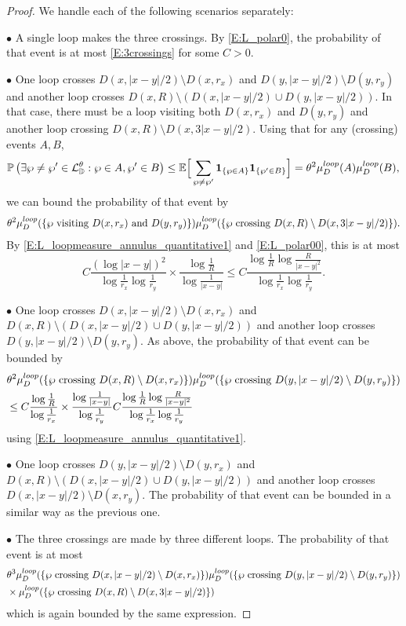 \documentclass[11pt]{article}
\theoremstyle{remark}
\newcommand{\D}{\mathbb{D}}
\newcommand{\Lc}{\mathcal{L}}
\newcommand{\Prob}[1]{\mathbb{P} \left( #1 \right) }
\newcommand{\E}{\mathbb{E}}
\newcommand{\indic}[1]{ \mathbf{1}_{ \left\{ #1 \right\} } }
\def \loopmeasure{\mu^{\rm loop}}
\numberwithin{equation}{section}
\begin{document}
\begin{proof}
We handle each of the following scenarios separately:

$\bullet$ A single loop makes the three crossings.
By \eqref{E:L_polar0}, the probability of that event is at most \eqref{E:3crossings} for some $C>0$.

$\bullet$ One loop crosses $D(x,|x-y|/2) \setminus D(x,r_x)$ and $D(y,|x-y|/2) \setminus D(y,r_y)$ and another loop crosses $D(x,R) \setminus (D(x,|x-y|/2) \cup D(y,|x-y|/2))$.
In that case, there must be a loop visiting both $D(x,r_x)$ and $D(y,r_y)$ and another loop crossing $D(x,R) \setminus D(x,3|x-y|/2)$.
Using that for any (crossing) events $A, B$,
\[
\Prob{ \exists \wp \neq \wp' \in \Lc_\D^\theta: \wp \in A, \wp' \in B }
\leq \E \Big[ \sum_{\wp \neq \wp'} \indic{ \wp \in A} \indic{\wp' \in B} \Big]
= \theta^2 \loopmeasure_D(A) \loopmeasure_D(B),
\]
we can bound the probability of that event by
\begin{align*}
\theta^2 \loopmeasure_D ( \{ \wp \text{~visiting~}  D(x,r_x) \text{~and~} D(y,r_y) \} )
\loopmeasure_D ( \{ \wp \text{~crossing~} D(x,R) \setminus D(x,3|x-y|/2) \} ).
\end{align*}
By \eqref{E:L_loopmeasure_annulus_quantitative1} and \eqref{E:L_polar00}, this is at most
\[
C \frac{(\log|x-y|)^2}{\log \frac{1}{r_x} \log \frac{1}{r_y}} \times \frac{\log \frac{1}{R}}{\log \frac{1}{|x-y|}} \leq C \frac{\log \frac{1}{R} \log \frac{R}{|x-y|^2}}{\log \frac{1}{r_x} \log \frac{1}{r_y}}.
\]

$\bullet$ One loop crosses $D(x,|x-y|/2) \setminus D(x,r_x)$ and $D(x,R) \setminus (D(x,|x-y|/2) \cup D(y,|x-y|/2))$ and another loop crosses $D(y,|x-y|/2) \setminus D(y,r_y)$. As above, the probability of that event can be bounded by
\begin{align*}
& \theta^2 \loopmeasure_D (\{ \wp \text{~crossing~} D(x,R) \setminus D(x,r_x) \})
\loopmeasure_D (\{ \wp \text{~crossing~} D(y,|x-y|/2) \setminus D(y,r_y) \}) \\
& \leq C \frac{\log \frac{1}{R}}{\log \frac{1}{r_x}} \times \frac{\log \frac{1}{|x-y|}}{\log \frac{1}{r_y}} C \frac{\log \frac{1}{R} \log \frac{R}{|x-y|^2}}{\log \frac{1}{r_x} \log \frac{1}{r_y}}
\end{align*}
using \eqref{E:L_loopmeasure_annulus_quantitative1}.

$\bullet$ One loop crosses $D(y,|x-y|/2) \setminus D(y,r_x)$ and $D(x,R) \setminus (D(x,|x-y|/2) \cup D(y,|x-y|/2))$ and another loop crosses $D(x,|x-y|/2) \setminus D(x,r_y)$. The probability of that event can be bounded in a similar way as the previous one.

$\bullet$ The three crossings are made by three different loops. The probability of that event is at most
\begin{align*}
& \theta^3 \loopmeasure_D (\{ \wp \text{~crossing~} D(x,|x-y|/2) \setminus D(x,r_x) \})
\loopmeasure_D (\{ \wp \text{~crossing~} D(y,|x-y|/2) \setminus D(y,r_y) \}) \\
& \times \loopmeasure_D (\{ \wp \text{~crossing~} D(x,R) \setminus D(x,3|x-y|/2) \} )
\end{align*}
which is again bounded by the same expression.
\end{proof}
\end{document}
